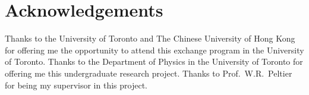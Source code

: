 \chapter*{Acknowledgements}
 Thanks
to the University of Toronto and The Chinese University of Hong Kong
for offering me the opportunity to attend this exchange program in
the University of Toronto. Thanks to the Department of Physics in
the University of Toronto for offering me this undergraduate
research project. Thanks to Prof.~W.R.~Peltier for being my
supervisor in this project.
